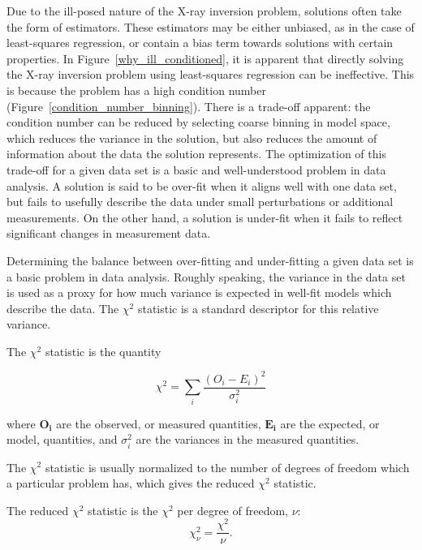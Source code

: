 Due to the ill-posed nature of the X-ray inversion problem, solutions often take the form of estimators. These estimators may be either unbiased, as in the case of least-squares regression, or contain a bias term towards solutions with certain properties. In Figure~\ref{why_ill_conditioned}, it is apparent that directly solving the X-ray inversion problem using least-squares regression can be ineffective. This is because the problem has a high condition number (Figure~\ref{condition_number_binning}). There is a trade-off apparent: the condition number can be reduced by selecting coarse binning in model space, which reduces the variance in the solution, but also reduces the amount of information about the data the solution represents. The optimization of this trade-off for a given data set is a basic and well-understood problem in data analysis. A solution is said to be over-fit when it aligns well with one data set, but fails to usefully describe the data under small perturbations or additional measurements. On the other hand, a solution is under-fit when it fails to reflect significant changes in measurement data. 

Determining the balance between over-fitting and under-fitting a given data set is a basic problem in data analysis. Roughly speaking, the variance in the data set is used as a proxy for how much variance is expected in well-fit models which describe the data. The $\chi^2$ statistic is a standard descriptor for this relative variance.

\begin{definition}
The $\chi^2$ statistic is the quantity 

$$\chi^2 = \sum_i \frac{(O_i - E_i)^2}{\sigma_i^2}$$

where $\mathbf{O_i}$ are the observed, or measured quantities, $\mathbf{E_i}$ are the expected, or model, quantities, and $\sigma_i^2$ are the variances in the measured quantities. 
\end{definition}

The $\chi^2$ statistic is usually normalized to the number of degrees of freedom which a particular problem has, which gives the reduced $\chi^2$ statistic.

\begin{definition}

The reduced $\chi^2$ statistic is the $\chi^2$ per degree of freedom, $\nu$: $$\chi^{2}_\nu = \frac{\chi^2}{\nu}.$$

\end{definition}

